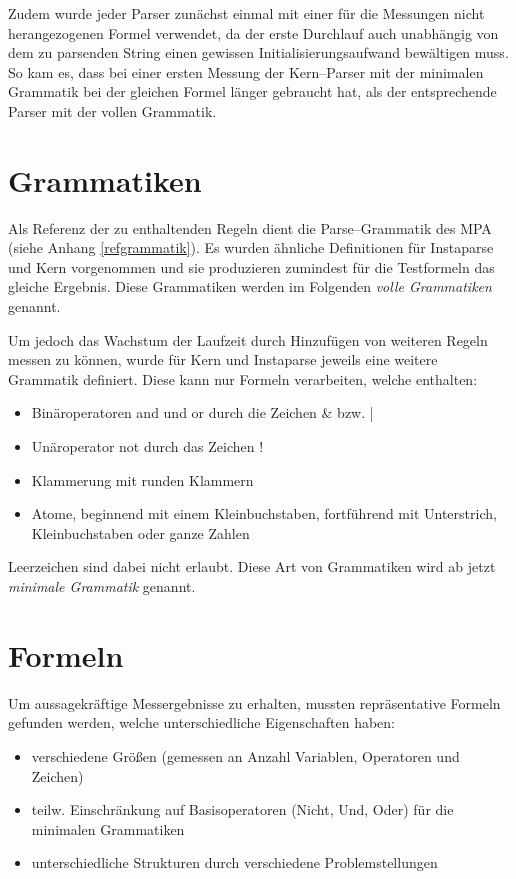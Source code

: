 \documentclass[ngerman,a4paper,abstracton,open=right,twoside=false,toc=listofnumbered,bibtotocnumbered]{scrreprt}
\begin{document}
Zudem wurde jeder Parser zunächst einmal mit einer für die Messungen nicht herangezogenen Formel verwendet, da der erste Durchlauf auch unabhängig von dem zu parsenden String einen gewissen Initialisierungsaufwand bewältigen muss. So kam es, dass bei einer ersten Messung der Kern--Parser mit der minimalen Grammatik bei der gleichen Formel länger gebraucht hat, als der entsprechende Parser mit der vollen Grammatik.

\section{Grammatiken}

Als Referenz der zu enthaltenden Regeln dient die Parse--Grammatik des MPA (siehe Anhang \ref{refgrammatik}). Es wurden ähnliche Definitionen für Instaparse und Kern vorgenommen und sie produzieren zumindest für die Testformeln das gleiche Ergebnis. Diese Grammatiken werden im Folgenden \emph{volle Grammatiken} genannt.

Um jedoch das Wachstum der Laufzeit durch Hinzufügen von weiteren Regeln messen zu können, wurde für Kern und Instaparse jeweils eine weitere Grammatik definiert. Diese kann nur Formeln verarbeiten, welche enthalten:

\begin{itemize}
	\item Binäroperatoren \glqq{}and\grqq{} und \glqq{}or\grqq{} durch die Zeichen \glqq{}\&\grqq{} bzw. \glqq{}|\grqq
	\item Unäroperator \glqq{}not\grqq{} durch das Zeichen \glqq{}!\grqq
	\item Klammerung mit runden Klammern
	\item Atome, beginnend mit einem Kleinbuchstaben, fortführend mit Unterstrich, Kleinbuchstaben oder ganze Zahlen
\end{itemize}

Leerzeichen sind dabei nicht erlaubt. Diese Art von Grammatiken wird ab jetzt \emph{minimale Grammatik} genannt.

\section{Formeln}

Um aussagekräftige Messergebnisse zu erhalten, mussten repräsentative Formeln gefunden werden, welche unterschiedliche Eigenschaften haben:

\begin{itemize}
	\item verschiedene Größen (gemessen an Anzahl Variablen, Operatoren und Zeichen)
	\item teilw. Einschränkung auf Basisoperatoren (Nicht, Und, Oder) für die minimalen Grammatiken
	\item unterschiedliche Strukturen durch verschiedene Problemstellungen
\end{itemize}
\end{document}
